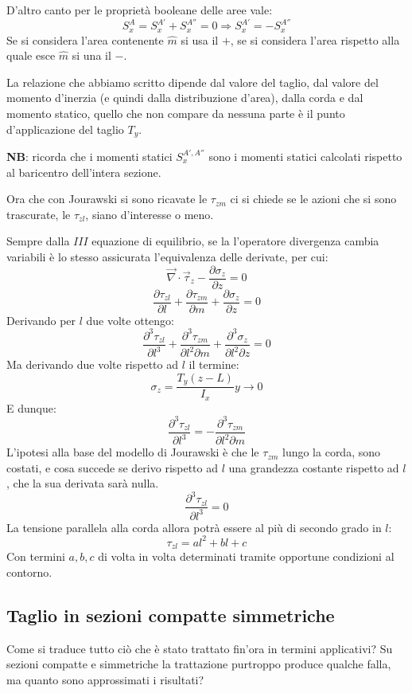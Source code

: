 		D'altro canto per le proprietà booleane delle aree vale: 
		\[ S_x^{A} = S_x^{A'} + S_x^{A''} = 0 \Rightarrow S_x^{A'} = -S_x^{A''}\]
		Se si considera l'area contenente $\hat{m}$ si usa il $+$, se si considera l'area rispetto alla quale esce $\hat{m}$ si una il $-$.\newline 
		
		La relazione che abbiamo scritto dipende dal valore del taglio, dal valore del momento d'inerzia (e quindi dalla distribuzione d'area), dalla corda e dal momento statico, quello che non compare da nessuna parte è il punto d'applicazione del taglio $T_y$. \newline
		
		\textbf{NB}: ricorda che i momenti statici $ S_x^{A',A''} $ sono i momenti statici calcolati rispetto al baricentro dell'intera sezione. \newline
		
		Ora che con Jourawski si sono ricavate le $\tau_{zm}$ ci si chiede se le azioni che si sono trascurate, le $\tau_{zl}$, siano d'interesse o meno. 
		
		Sempre dalla $III$ equazione di equilibrio, se la l'operatore divergenza cambia variabili è lo stesso assicurata l'equivalenza delle derivate, per cui: 
		\[ \vec{\nabla}\cdot\vec{\tau}_z  -\dfrac{\partial \sigma_z}{\partial z} = 0\]
		\[ \dfrac{\partial \tau_{zl}}{\partial l} + \dfrac{\partial\tau_{zm}}{\partial m} + \dfrac{\partial\sigma_z}{\partial z} = 0\]
		Derivando per $l$ due volte ottengo: 
		\[ \dfrac{\partial^3 \tau_{zl}}{\partial l^3} + \dfrac{\partial^3\tau_{zm}}{\partial l^2\partial m} + \dfrac{\partial^3\sigma_z}{\partial l^2\partial z} = 0\]
		Ma derivando due volte rispetto ad $l$ il termine:
		\[\sigma_z =  \dfrac{T_y(z-L)}{I_x}y \rightarrow 0\]
		E dunque:
		\[ \dfrac{\partial^3 \tau_{zl}}{\partial l^3} = - \dfrac{\partial^3\tau_{zm}}{\partial l^2\partial m}\]
		L'ipotesi alla base del modello di Jourawski è che le $\tau_{zm}$ lungo la corda, sono costati, e cosa succede se derivo rispetto ad $l$ una grandezza costante rispetto ad $l$, che la sua derivata sarà nulla. 		
		\[ \dfrac{\partial^3 \tau_{zl}}{\partial l^3} = 0\]
		La tensione parallela alla corda allora potrà essere al più di secondo grado in $l$:
		\[ \tau_{zl} = al^2 + bl + c\]
		Con termini $a,b,c$ di volta in volta determinati tramite opportune condizioni al contorno. 
		
\subsection{ Taglio in sezioni compatte simmetriche}
		Come si traduce tutto ciò che è stato trattato fin'ora in termini applicativi? Su sezioni compatte e simmetriche la trattazione purtroppo produce qualche falla, ma quanto sono approssimati i risultati?
		
